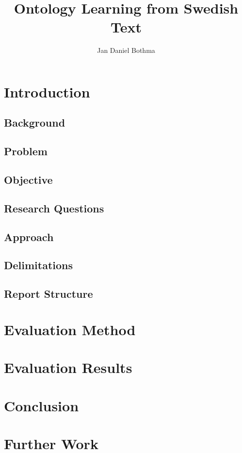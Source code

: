 \documentclass[a4paper]{report}
\title{Ontology Learning from Swedish Text}
\author{Jan Daniel Bothma}
\begin{document}
\chapter{Introduction}

\section{Background}

\section{Problem}

\section{Objective}

\section{Research Questions}

\section{Approach}

\section{Delimitations}

\section{Report Structure}


\chapter{Evaluation Method}


\chapter{Evaluation Results}


\chapter{Conclusion}


\chapter{Further Work}

\clearpage
{}

\renewcommand\bibname{References}


\end{document}
